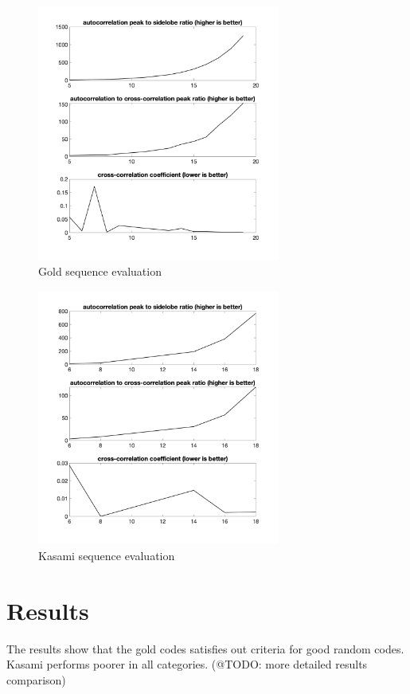 \begin{figure}[h]
	\includegraphics[width=8cm]{images/matlabplots/gold}

	\caption{Gold sequence evaluation}
\end{figure}

\begin{figure}[h]
	\includegraphics[width=8cm]{images/matlabplots/kasami}

	\caption{Kasami sequence evaluation}
\end{figure}
\section{Results}

The results show that the gold codes satisfies out criteria for good random codes. Kasami performs poorer in all categories. (@TODO: more detailed results comparison)
